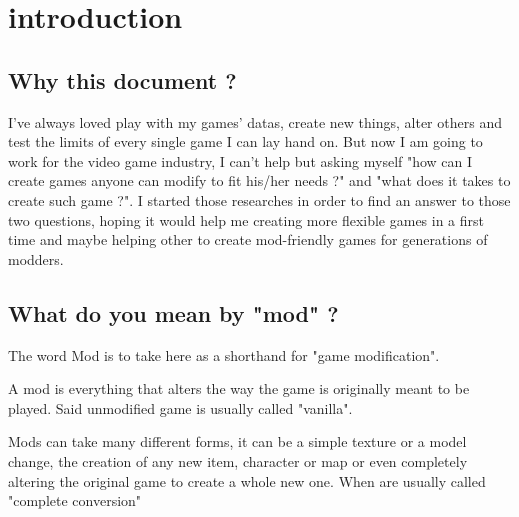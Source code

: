 \documentclass[a4paper,11pt]{article}
\begin{document}
\thispagestyle{empty}
\sffamily


\newpage
{}
\newpage


\section{introduction}

\subsection{Why this document ?}

I've always loved play with my games' datas, create new things, alter others and test the limits of every single game I can lay hand on. But now I am going to work for the video game industry, I can't help but asking myself "how can I create games anyone can modify to fit his/her needs ?" and "what does it takes to create such game ?". I started those researches in order to find an answer to those two questions, hoping it would help me creating more flexible games in a first time and maybe helping other to create mod-friendly games for generations of modders.

\subsection{What do you mean by "mod" ?}

The word Mod is to take here as a shorthand for "game modification".

A mod is everything that alters the way the game is originally meant to be played. Said unmodified game is usually called "vanilla".

Mods can take many different forms, it can be a simple texture or a model change, the creation of any new item, character or map or even completely altering the original game to create a whole new one. When  are usually called "complete conversion"
\end{document}
